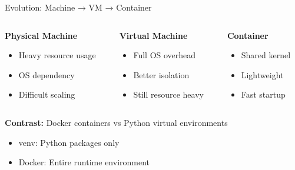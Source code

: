 \documentclass[../main.tex]{subfiles}
\begin{document}
\begin{frame}{Evolution: Machine → VM → Container}
    \begin{columns}
        \begin{column}{0.33\textwidth}
            \textbf{Physical Machine}
            \begin{itemize}
                \item Heavy resource usage
                \item OS dependency
                \item Difficult scaling
            \end{itemize}
        \end{column}

        \begin{column}{0.33\textwidth}
            \textbf{Virtual Machine}
            \begin{itemize}
                \item Full OS overhead
                \item Better isolation
                \item Still resource heavy
            \end{itemize}
        \end{column}

        \begin{column}{0.33\textwidth}
            \textbf{Container}
            \begin{itemize}
                \item Shared kernel
                \item Lightweight
                \item Fast startup
            \end{itemize}
        \end{column}
    \end{columns}

    \bigskip

    \textbf{Contrast:} Docker containers vs Python virtual environments
    \begin{itemize}
        \item venv: Python packages only
        \item Docker: Entire runtime environment
    \end{itemize}
\end{frame}
\end{document}
